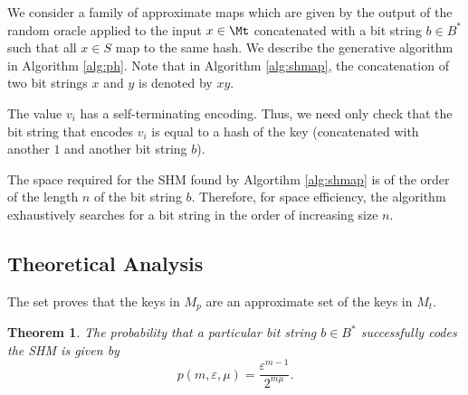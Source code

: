 \documentclass[
]{article}
\newtheorem{theorem}{Theorem}[section]
\theoremstyle{definition}
\theoremstyle{definition}
\theoremstyle{definition}
\theoremstyle{definition}
\theoremstyle{remark}
\begin{document}
We consider a family of approximate maps which are given by the output of the random oracle applied to the input \(x \in \Mt\) concatenated with a bit string \(b \in B^*\) such that all \(x \in S\) map to the same hash. We describe the generative algorithm in Algorithm \ref{alg:ph}. Note that in Algorithm \ref{alg:shmap}, the concatenation of two bit strings \(x\) and \(y\) is denoted by \(x y\).

The value \(v_i\) has a self-terminating encoding. Thus, we need only check that the bit string that encodes \(v_i\) is equal to a hash of the key (concatenated with another \(1\) and another bit string \(b\)).

The space required for the SHM found by Algortihm \ref{alg:shmap} is of the order of the length \(n\) of the bit string \(b\). Therefore, for space efficiency, the algorithm exhaustively searches for a bit string in the order of increasing size \(n\).

\hypertarget{theoretical-analysis}{%
\subsection{Theoretical Analysis}\label{theoretical-analysis}}

The set proves that the keys in \(M_p\) are an approximate set of the keys in \(M_t\).

\begin{theorem}
The probability that a particular bit string \(b \in B^*\) successfully codes the SHM is given by
\begin{equation}
    p(m,\varepsilon,\mu) = \frac{\varepsilon^{m-1}}{2^{m \mu}}.
\end{equation}
\end{theorem}
\end{document}
